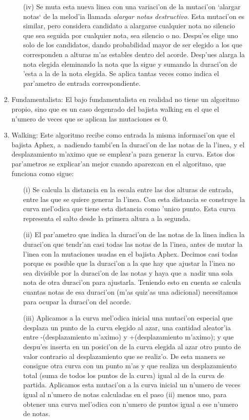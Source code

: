 \begin{enumerate}
\begin{enumerate}
		\item[(iv)] Se muta esta nueva linea con una variaci'on de la mutaci'on `alargar notas` de la melod'ia llamada \emph{alargar notas destructivo}. Esta mutaci'on es similar, pero considera candidato a alargarse cualquier nota no silencio que sea seguida por cualquier nota, sea silencio o no. Despu'es elige uno solo de los candidatos, dando probabilidad mayor de ser elegido a los que corresponden a alturas m'as estables dentro del acorde. Desp'ues alarga la nota elegida eleminando la nota que la sigue y sumando la duraci'on de 'esta a la de la nota elegida. Se aplica tantas veces como indica el par'ametro de entrada correspondiente.
		\end{enumerate}
	\item Fundamentalista: El bajo fundamentalista en realidad no tiene un algoritmo propio, sino que es un caso degenrado del bajista walking en el que el n'umero de veces que se aplican las mutaciones es 0.
	\item Walking: Este algoritmo recibe como entrada la misma informaci'on que el bajista Aphex, a~nadiendo tambi'en la duraci'on de las notas de la l'inea, y el desplazamiento m'aximo que se emplear'a para generar la curva. Estos dos par'ametros se explicar'an mejor cuando aparezcan en el algoritmo, que funciona como sigue:
		\begin{enumerate}
		\item[(i)] Se calcula la distancia en la escala entre las dos alturas de entrada, entre las que se quiere generar la l'inea. Con esta distancia se construye la curva mel'odica que tiene esta distancia como 'unico punto. Esta curva representa el salto desde la primera altura a la segunda. 
		\item[(ii)] El par'ametro que indica la duraci'on de las notas de la linea indica la duraci'on que tendr'an casi todas las notas de la l'inea, antes de mutar la l'inea con la mutaciones usadas en el bajista Aphex. Decimos casi todas porque es posible que la duraci'on a la que hay que ajustar la l'inea no sea divisible por la duraci'on de las notas y haya que a~nadir una sola nota de otra duraci'on para ajustarla. Teniendo esto en cuenta se calcula cuantas notas de esa duraci'on (m'as quiz'as una adicional) necesitamos para ocupar la duraci'on del acorde.
		\item[(iii)] Aplicamos a la curva mel'odica inicial una mutaci'on especial que desplaza un punto de la curva elegido al azar, una cantidad aleator'ia entre -(desplazamiento m'aximo) y +(desplazamiento m'aximo); y que despu'es inserta en un posici'on de la curva elegida al azar otro punto de valor contrario al desplazamiento que se realiz'o. De esta manera se consigue otra curva con un punto m'as y que realiza un desplazamiento total (suma de todos los puntos de la curva) igual al de la curva de partida. Aplicamos esta mutaci'on a la curva inicial un n'umero de veces igual al n'umero de notas calculadas en el paso (ii) menos uno, para obtener una curva mel'odica con n'umero de puntos igual a ese n'umero de notas.

\end{enumerate}
\end{enumerate}
